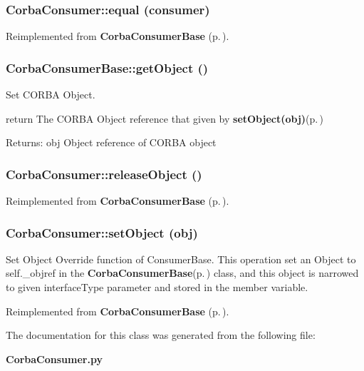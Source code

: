 \subsubsection{\setlength{\rightskip}{0pt plus 5cm}Corba\-Consumer::equal (consumer)}\label{classCorbaConsumer_CorbaConsumera1}




Reimplemented from {\bf Corba\-Consumer\-Base} {\rm (p.\,\pageref{classCorbaConsumerBase_CorbaConsumerBasea1})}.
\subsubsection{\setlength{\rightskip}{0pt plus 5cm}Corba\-Consumer\-Base::get\-Object ()\hspace{0.3cm}{\tt  [inherited]}}\label{classCorbaConsumerBase_CorbaConsumerBasea4}


Set CORBA Object. 

return The CORBA Object reference that given by {\bf set\-Object(obj)}{\rm (p.\,\pageref{classCorbaConsumerBase_CorbaConsumerBasea3})} \begin{Desc}
\item[Returns:]obj Object reference of CORBA object\end{Desc}
\subsubsection{\setlength{\rightskip}{0pt plus 5cm}Corba\-Consumer::release\-Object ()}\label{classCorbaConsumer_CorbaConsumera5}




Reimplemented from {\bf Corba\-Consumer\-Base} {\rm (p.\,\pageref{classCorbaConsumerBase_CorbaConsumerBasea5})}.
\subsubsection{\setlength{\rightskip}{0pt plus 5cm}Corba\-Consumer::set\-Object (obj)}\label{classCorbaConsumer_CorbaConsumera3}


Set Object Override function of Consumer\-Base. This operation set an Object to self.\_\-objref in the {\bf Corba\-Consumer\-Base}{\rm (p.\,\pageref{classCorbaConsumerBase})} class, and this object is narrowed to given interface\-Type parameter and stored in the member variable. 



Reimplemented from {\bf Corba\-Consumer\-Base} {\rm (p.\,\pageref{classCorbaConsumerBase_CorbaConsumerBasea3})}.

The documentation for this class was generated from the following file:\begin{CompactItemize}
\item 
{\bf Corba\-Consumer.py}\end{CompactItemize}
